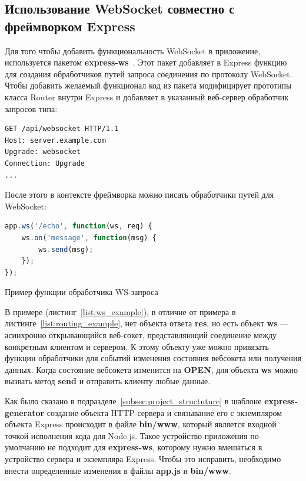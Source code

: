 \subsection{Использование WebSocket совместно с фреймворком Express}
Для того чтобы добавить функциональность WebSocket в приложение, используется пакетом \textbf{express-ws}~\autocite{express-ws}. Этот пакет добавляет в Express функцию для создания обработчиков путей запроса соединения по протоколу WebSocket. Чтобы добавить желаемый функционал код из пакета модифицирует прототипы класса Router внутри Express и добавляет в указанный веб-сервер обработчик запросов типа:
\begin{lstlisting}[language]
GET /api/websocket HTTP/1.1
Host: server.example.com
Upgrade: websocket
Connection: Upgrade
...
\end{lstlisting}
После этого в контексте фреймворка можно писать обработчики путей для WebSocket:
\begin{ListingEnv}[H]
	\begin{lstlisting}[language=JavaScript]
app.ws('/echo', function(ws, req) {
	ws.on('message', function(msg) {
		ws.send(msg);
	});
});
	\end{lstlisting}
	\caption{Пример функции обработчика WS-запроса}
	\label{list:ws_example}
\end{ListingEnv}
В примере (листинг~\ref{list:ws_example}), в отличие от примера в листинге~\ref{list:routing_example}, нет объекта ответа \textbf{res}, но есть объект \textbf{ws} --- асинхронно открывающийся веб-сокет, представляющий соединение между конкретным клиентом и сервером. К этому объекту уже можно привязать функции обработчики для событий изменения состояния вебсокета или получения данных. Когда состояние вебсокета изменится на \textbf{OPEN}, для объекта \textbf{ws} можно вызвать метод \textbf{send} и отправить клиенту любые данные.   

Как было сказано в подразделе~\ref{subsec:project_structuture} в шаблоне \textbf{express-generator} создание объекта HTTP-сервера и связывание его с экземпляром объекта Express происходит в файле \textbf{bin/www}, который является входной точкой исполнения кода для Node.js. Такое устройство приложения по-умолчанию не подходит для \textbf{express-ws}, которому нужно вмешаться в устройство сервера и экземпляра Express. Чтобы это исправить, необходимо внести определенные изменения в файлы \textbf{app.js} и \textbf{bin/www}.

